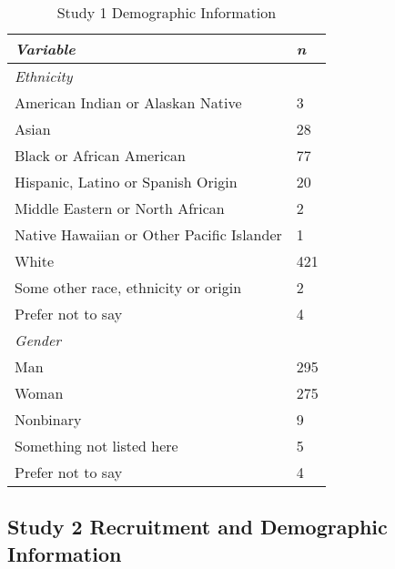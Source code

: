 \documentclass[12pt,]{article}
\begin{document}
\begin{table}[ht]
    \centering
    \begin{tabular}{l l}
        \toprule
        \emph{Variable} & \emph{n} \\
        \midrule
        \emph{Ethnicity} &  \\
        \hspace{1em} American Indian or Alaskan Native & 3 \\
        \hspace{1em} Asian & 28 \\
        \hspace{1em} Black or African American & 77 \\
        \hspace{1em} Hispanic, Latino or Spanish Origin & 20 \\
        \hspace{1em} Middle Eastern or North African& 2 \\
        \hspace{1em} Native Hawaiian or Other Pacific Islander & 1 \\ 
        \hspace{1em} White & 421 \\ 
        \hspace{1em} Some other race, ethnicity or origin & 2 \\ 
        \hspace{1em} Prefer not to say & 4 \\ 
      \emph{Gender} & \\ 
         \hspace{1em} Man & 295 \\
         \hspace{1em} Woman & 275 \\
         \hspace{1em} Nonbinary & 9 \\
         \hspace{1em} Something not listed here & 5 \\
         \hspace{1em} Prefer not to say & 4 \\
        \bottomrule
    \end{tabular}
    \caption{Study 1 Demographic Information}
    \label{demo1}
\end{table}


\clearpage
\subsection{Study 2 Recruitment and Demographic Information}
\label{appendix:recruit_2}
\end{document}
